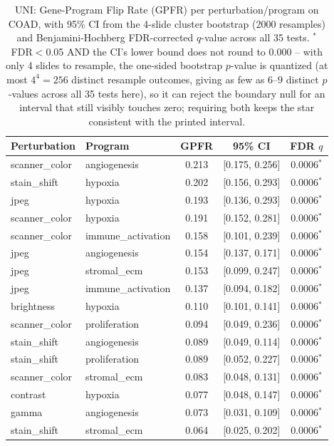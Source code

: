 \begin{table}[t]
\centering
\caption{UNI: Gene-Program Flip Rate (GPFR) per perturbation/program on COAD, with 95\% CI from the 4-slide cluster bootstrap (2000 resamples) and Benjamini-Hochberg FDR-corrected $q$-value across all 35 tests. $^{*}$ FDR$<$0.05 AND the CI's lower bound does not round to 0.000 -- with only 4 slides to resample, the one-sided bootstrap $p$-value is quantized (at most $4^4=256$ distinct resample outcomes, giving as few as 6--9 distinct $p$-values across all 35 tests here), so it can reject the boundary null for an interval that still visibly touches zero; requiring both keeps the star consistent with the printed interval.}
\label{tab:gpfr_coad_uni}
\begin{tabular}{llccc}
\toprule
Perturbation & Program & GPFR & 95\% CI & FDR $q$ \\
\midrule
scanner\_color & angiogenesis & 0.213 & [0.175, 0.256] & 0.0006$^{*}$ \\
stain\_shift & hypoxia & 0.202 & [0.156, 0.293] & 0.0006$^{*}$ \\
jpeg & hypoxia & 0.193 & [0.136, 0.293] & 0.0006$^{*}$ \\
scanner\_color & hypoxia & 0.191 & [0.152, 0.281] & 0.0006$^{*}$ \\
scanner\_color & immune\_activation & 0.158 & [0.101, 0.239] & 0.0006$^{*}$ \\
jpeg & angiogenesis & 0.154 & [0.137, 0.171] & 0.0006$^{*}$ \\
jpeg & stromal\_ecm & 0.153 & [0.099, 0.247] & 0.0006$^{*}$ \\
jpeg & immune\_activation & 0.137 & [0.094, 0.182] & 0.0006$^{*}$ \\
brightness & hypoxia & 0.110 & [0.101, 0.141] & 0.0006$^{*}$ \\
scanner\_color & proliferation & 0.094 & [0.049, 0.236] & 0.0006$^{*}$ \\
stain\_shift & angiogenesis & 0.089 & [0.049, 0.114] & 0.0006$^{*}$ \\
stain\_shift & proliferation & 0.089 & [0.052, 0.227] & 0.0006$^{*}$ \\
scanner\_color & stromal\_ecm & 0.083 & [0.048, 0.131] & 0.0006$^{*}$ \\
contrast & hypoxia & 0.077 & [0.048, 0.147] & 0.0006$^{*}$ \\
gamma & angiogenesis & 0.073 & [0.031, 0.109] & 0.0006$^{*}$ \\
stain\_shift & stromal\_ecm & 0.064 & [0.025, 0.202] & 0.0006$^{*}$ \\

\end{tabular}
\end{table}
